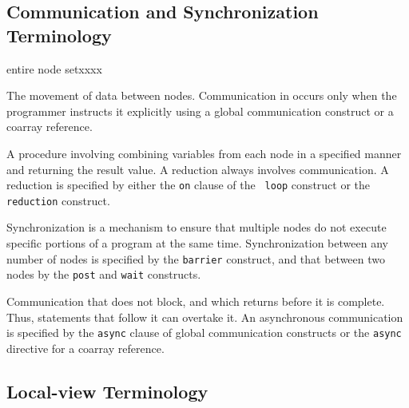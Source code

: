 \subsection{Communication and Synchronization Terminology}

\begin{namelist}{entire node setxxxx}


 The movement of data between nodes. Communication in {\XMP} occurs only
 when the programmer instructs it explicitly using a global communication
 construct or a coarray reference.


 A procedure involving combining variables from each node in a specified
 manner and returning the result value. A reduction always involves
 communication.
%
 A reduction is specified by either the {\tt on} clause of the {\tt
 loop} construct or the {\tt reduction} construct.


 Synchronization is a mechanism to ensure that multiple nodes do not
 execute specific portions of a program at the same
 time. Synchronization between any number of nodes is specified by the
 {\tt barrier} construct, and that between two nodes by the {\tt post} and
 {\tt wait} constructs.


 Communication that does not block, and which returns before it is
 complete. Thus, statements that follow it can overtake it. An
 asynchronous communication is specified by the {\tt async} clause of
 global communication constructs or the {\tt async} directive for
 a coarray reference.

\end{namelist}

\subsection{Local-view Terminology}\label{sub:localViewTerminology}

